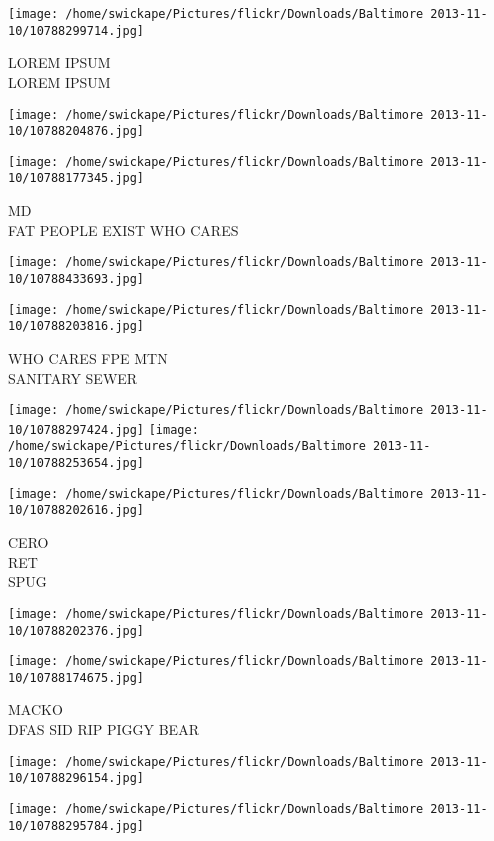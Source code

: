 \documentclass[10pt,letterpaper]{article}
\begin{document}
\vspace{0.25in}
\texttt{[image: /home/swickape/Pictures/flickr/Downloads/Baltimore 2013-11-10/10788299714.jpg]}

LOREM IPSUM\\
LOREM IPSUM
\pagebreak

\texttt{[image: /home/swickape/Pictures/flickr/Downloads/Baltimore 2013-11-10/10788204876.jpg]}

\vspace{0.25in}
\texttt{[image: /home/swickape/Pictures/flickr/Downloads/Baltimore 2013-11-10/10788177345.jpg]}

MD\\
FAT PEOPLE EXIST WHO CARES
\pagebreak

\texttt{[image: /home/swickape/Pictures/flickr/Downloads/Baltimore 2013-11-10/10788433693.jpg]}

\vspace{0.25in}
\texttt{[image: /home/swickape/Pictures/flickr/Downloads/Baltimore 2013-11-10/10788203816.jpg]}

WHO CARES FPE MTN\\
SANITARY SEWER
\pagebreak

\texttt{[image: /home/swickape/Pictures/flickr/Downloads/Baltimore 2013-11-10/10788297424.jpg]}
\texttt{[image: /home/swickape/Pictures/flickr/Downloads/Baltimore 2013-11-10/10788253654.jpg]}

\vspace{0.25in}
\texttt{[image: /home/swickape/Pictures/flickr/Downloads/Baltimore 2013-11-10/10788202616.jpg]}

CERO\\
RET\\
SPUG
\pagebreak

\texttt{[image: /home/swickape/Pictures/flickr/Downloads/Baltimore 2013-11-10/10788202376.jpg]}

\vspace{0.25in}
\texttt{[image: /home/swickape/Pictures/flickr/Downloads/Baltimore 2013-11-10/10788174675.jpg]}

MACKO\\
DFAS SID RIP PIGGY BEAR
\pagebreak

\texttt{[image: /home/swickape/Pictures/flickr/Downloads/Baltimore 2013-11-10/10788296154.jpg]}

\vspace{0.25in}
\texttt{[image: /home/swickape/Pictures/flickr/Downloads/Baltimore 2013-11-10/10788295784.jpg]}
\end{document}
